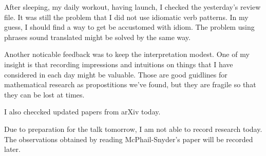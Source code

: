 \documentclass[11pt]{amsart}
\begin{document}
After sleeping, my daily workout, having launch, I checked the yesterday's review file.
It was still the problem that I did not use idiomatic verb patterns.
In my guess, I should find a way to get be accustomed with idiom.
The problem using phrases sound translated might be solved by the same way.

Another noticable feedback was to keep the interpretation modest.
One of my insight is that recording impressions and intuitions on things that I have considered in each day might be valuable.
Those are good guidlines for mathematical research as propostitions we've found, but they are fragile so that they can be lost at times.

\par\vspace{1em}

I also checcked updated papers from arXiv today.

\par\vspace{1em}

Due to preparation for the talk tomorrow, I am not able to record research today.
The observations obtained by reading McPhail-Snyder's paper will be recorded later.









\end{document}
